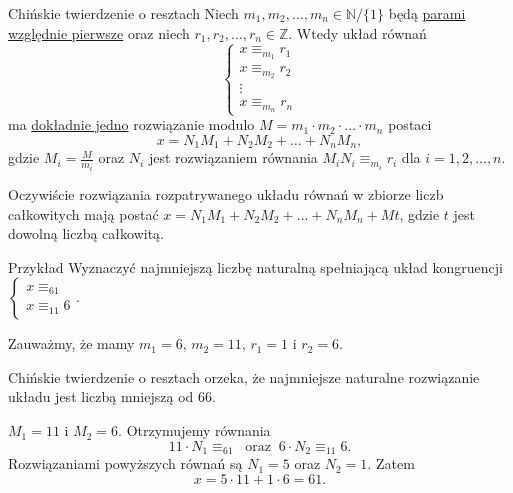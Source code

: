 \documentclass[a4paper,10pt]{beamer}
\begin{document}
\begin{frame}
	
	\begin{block}{Chińskie twierdzenie o resztach}
		Niech $m_1,m_2,\ldots,m_n\in\mathbb{N}/\{1\}$ będą \underline{parami względnie pierwsze}  oraz niech $r_1,r_2,\ldots,r_n\in\mathbb{Z}$. Wtedy układ równań
		$$\left\{\begin{array}{l}x\equiv_{m_1}r_1\\x\equiv_{m_2}r_2\\\vdots\\x\equiv_{m_n}r_n\end{array}\right.$$
		ma \underline{dokładnie jedno} rozwiązanie modulo $M=m_1\cdot m_2\cdot\ldots\cdot m_n$ postaci
		$$x=N_1M_1+N_2M_2+\ldots+N_nM_n,$$
		gdzie $\displaystyle M_i=\frac{M}{m_i}$ oraz $N_i$ jest rozwiązaniem równania $M_iN_i\equiv_{m_i}r_i$ dla $i=1,2,\ldots,n$.
	\end{block}

	Oczywiście rozwiązania rozpatrywanego układu równań w zbiorze liczb całkowitych mają postać $x=N_1M_1+N_2M_2+\ldots+N_nM_n+Mt$, gdzie $t$ jest dowolną liczbą całkowitą.
		
\end{frame}


\begin{frame}
	
	\begin{exampleblock}{Przykład}
		Wyznaczyć najmniejszą liczbę naturalną spełniającą układ kongruencji $\displaystyle\left\{\begin{array}{l}x\equiv_61\\x\equiv_{11}6\end{array}\right.$.
		
		Zauważmy, że mamy $m_1=6$, $m_2=11$, $r_1=1$ i $r_2=6$.
		
		Chińskie twierdzenie o resztach orzeka, że najmniejsze naturalne rozwiązanie układu jest liczbą mniejszą od $66$.
		
		$M_1=11$ i $M_2=6$. Otrzymujemy równania
		$$11\cdot N_1\equiv_61\ \mbox{ oraz }\ 6\cdot N_2\equiv_{11}6.$$
		Rozwiązaniami powyższych równań są $N_1=5$ oraz $N_2=1$. Zatem
		$$x=5\cdot11+1\cdot6=61.$$
	\end{exampleblock}
	
\end{frame}
\end{document}
